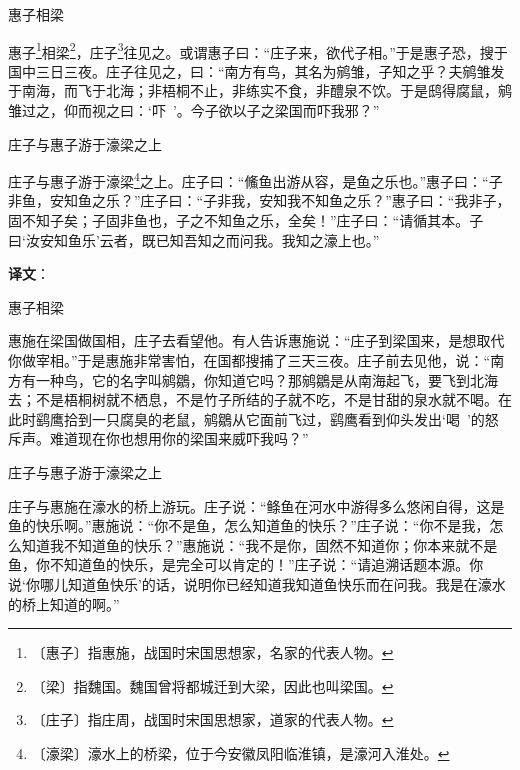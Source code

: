 \documentclass[12pt,UTF-8,openany]{ctexbook}
\begin{document}
\begin{normalsize}
    
    惠子相梁
    
    惠子\footnote{〔惠子〕指惠施，战国时宋国思想家，名家的代表人物。}相梁\footnote{〔梁〕指魏国。魏国曾将都城迁到大梁，因此也叫梁国。}，庄子\footnote{〔庄子〕指庄周，战国时宋国思想家，道家的代表人物。}往见之。或谓惠子曰：“庄子来，欲代子相。”于是惠子恐，搜于国中三日三夜。庄子往见之，曰：“南方有鸟，其名为鹓雏，子知之乎？夫鹓雏发于南海，而飞于北海；非梧桐不止，非练实不食，非醴泉不饮。于是鸱得腐鼠，鹓雏过之，仰而视之曰：‘吓~’。今子欲以子之梁国而吓我邪？”
    
    庄子与惠子游于濠梁之上
    
    庄子与惠子游于濠梁\footnote{〔濠梁〕濠水上的桥梁，位于今安徽凤阳临淮镇，是濠河入淮处。}之上。庄子曰：“鯈鱼出游从容，是鱼之乐也。”惠子曰：“子非鱼，安知鱼之乐？”庄子曰：“子非我，安知我不知鱼之乐？”惠子曰：“我非子，固不知子矣；子固非鱼也，子之不知鱼之乐，全矣！”庄子曰：“请循其本。子曰‘汝安知鱼乐’云者，既已知吾知之而问我。我知之濠上也。”
\end{normalsize}


\newpage

\textbf{译文}：

\vspace{1em}

\begin{normalsize}
    
    惠子相梁
    
    惠施在梁国做国相，庄子去看望他。有人告诉惠施说：“庄子到梁国来，是想取代你做宰相。”于是惠施非常害怕，在国都搜捕了三天三夜。庄子前去见他，说：“南方有一种鸟，它的名字叫鹓鶵，你知道它吗？那鹓鶵是从南海起飞，要飞到北海去；不是梧桐树就不栖息，不是竹子所结的子就不吃，不是甘甜的泉水就不喝。在此时鹞鹰拾到一只腐臭的老鼠，鹓鶵从它面前飞过，鹞鹰看到仰头发出‘喝~’的怒斥声。难道现在你也想用你的梁国来威吓我吗？”
    
    庄子与惠子游于濠梁之上
    
    庄子与惠施在濠水的桥上游玩。庄子说：“鲦鱼在河水中游得多么悠闲自得，这是鱼的快乐啊。”惠施说：“你不是鱼，怎么知道鱼的快乐？”庄子说：“你不是我，怎么知道我不知道鱼的快乐？”惠施说：“我不是你，固然不知道你；你本来就不是鱼，你不知道鱼的快乐，是完全可以肯定的！”庄子说：“请追溯话题本源。你说‘你哪儿知道鱼快乐’的话，说明你已经知道我知道鱼快乐而在问我。我是在濠水的桥上知道的啊。”
    
\end{normalsize}


\newpage
\end{document}
